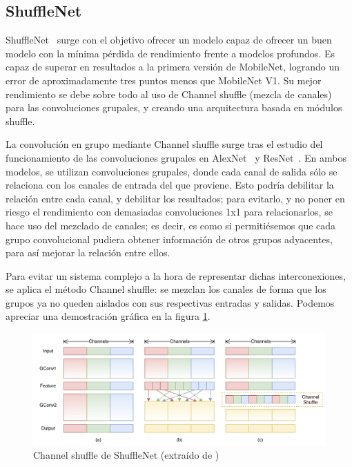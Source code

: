 \subsection{ShuffleNet}

ShuffleNet~\cite{zhang2017shufflenet,shufflenetreview} surge con el objetivo ofrecer un modelo capaz de ofrecer un buen modelo con la mínima pérdida de rendimiento frente a modelos profundos. Es capaz de superar en resultados a la primera versión de MobileNet, logrando un error de aproximadamente tres puntos menos que MobileNet V1. Su mejor rendimiento se debe sobre todo al uso de Channel shuffle (mezcla de canales) para las convoluciones grupales, y creando una arquitectura basada en módulos shuffle.

La convolución en grupo mediante Channel shuffle surge tras el estudio del funcionamiento de las convoluciones grupales en 	AlexNet~\cite{NIPS2012_c399862d} y ResNet~\cite{DBLP:journals/corr/HeZRS15}. En ambos modelos, se utilizan convoluciones grupales, donde cada canal de salida sólo se relaciona con los canales de entrada del que proviene. Esto podría debilitar la relación entre cada canal, y debilitar los resultados; para evitarlo, y no poner en riesgo el rendimiento con demasiadas convoluciones 1x1 para relacionarlos, se hace uso del mezclado de canales; es decir, es como si permitiésemos que cada grupo convolucional pudiera obtener información de otros grupos adyacentes, para así mejorar la relación entre ellos.

Para evitar un sistema complejo a la hora de representar dichas interconexiones, se aplica el método Channel shuffle: se mezclan los canales de forma que los grupos ya no queden aislados con sus respectivas entradas y salidas. Podemos apreciar una demostración gráfica en la figura \ref{shufflechannels}.

    \begin{figure}[H]

	\centering
	\includegraphics[scale = 0.2]{imagenes/shufflechannels.png}
	\caption{Channel shuffle de ShuffleNet (extraído de \cite{zhang2017shufflenet})}
	\label{shufflechannels}
\end{figure}

